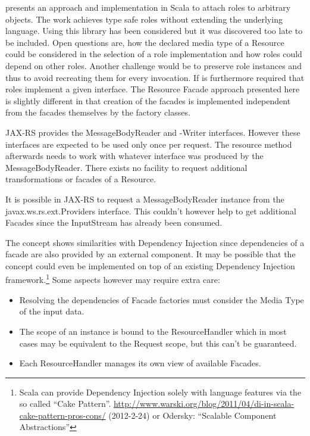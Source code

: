 \documentclass[12pt,a4paper,twoside]{scrartcl}		%
\newcommand{\citeurl}[2]{\url{#1} (#2)}
\begin{document}
\cite{Pradel2008a} presents an approach and implementation in Scala to attach
roles to arbitrary objects. The work achieves type safe roles without extending
the underlying language. Using this library has been considered but it was
discovered too late to be included. Open questions are, how the declared media
type of a Resource could be considered in the selection of a role implementation
and how roles could depend on other roles. Another challenge would be to
preserve role instances and thus to avoid recreating them for every
invocation. If is furthermore required that roles implement a given
interface. The Resource Facade approach presented here is slightly different in
that creation of the facades is implemented independent from the facades
themselves by the factory classes.

JAX-RS provides the MessageBodyReader and -Writer interfaces. However these
interfaces are expected to be used only once per request. The resource method
afterwards needs to work with whatever interface was produced by the
MessageBodyReader. There exists no facility to request additional
transformations or facades of a Resource.

It is possible in JAX-RS to request a MessageBodyReader instance from the
javax.ws.rs.ext.Providers interface. This couldn't however help to get
additional Facades since the InputStream has already been consumed.

The concept shows similarities with Dependency Injection since dependencies of a
facade are also provided by an external component. It may be possible that the
concept could even be implemented on top of an existing Dependency Injection
framework.\footnote{Scala can provide Dependency Injection solely with language
  features via the so called ``Cake
  Pattern''. \citeurl{http://www.warski.org/blog/2011/04/di-in-scala-cake-pattern-pros-cons/}{2012-2-24}
  or Odersky: ``Scalable Component Abstractions''} Some aspects however may
require extra care:

\begin{itemize}
\item Resolving the dependencies of Facade factories must consider the Media
  Type of the input data.
\item The scope of an instance is bound to the ResourceHandler which in most
  cases may be equivalent to the Request scope, but this can't be guaranteed.
\item Each ResourceHandler manages its own view of available Facades.
\end{itemize}
\end{document}

